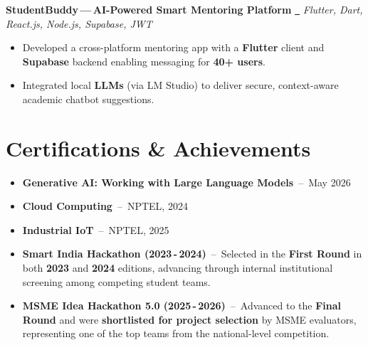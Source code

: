 \documentclass[a4paper,9pt]{article}
\begin{document}
{\vspace{3pt}

\noindent
\textbf{StudentBuddy\,---\,AI-Powered Smart Mentoring Platform}\;
\href{https://github.com/DEVARAJ-07/StudentBuddy}{\faGithub\ }
\hfill
\textit{Flutter, Dart, React.js, Node.js, Supabase, JWT}

\begin{itemize}[leftmargin=1em, itemsep=1pt, nosep]
  \item Developed a cross-platform mentoring app with a \textbf{Flutter} client and \textbf{Supabase} backend enabling messaging for \textbf{40+ users}.
  \item Integrated local \textbf{LLMs} (via LM Studio) to deliver secure, context-aware academic chatbot suggestions.
\end{itemize}

}

\section{Certifications \& Achievements}
{\small
\begin{itemize}[nosep, leftmargin=1em, itemsep=3pt]

  \item \textbf{Generative AI: Working with Large Language Models} \,--\, May 2026
  \item \textbf{Cloud Computing} \,--\, NPTEL, 2024
  \item \textbf{Industrial IoT} \,--\, NPTEL, 2025

  \item \textbf{Smart India Hackathon (2023\,-\,2024)} \,--\, Selected in the \textbf{First Round}
        in both \textbf{2023} and \textbf{2024} editions, advancing through internal
        institutional screening among competing student teams.

  \item \textbf{MSME Idea Hackathon 5.0 (2025\,-\,2026)} \,--\, Advanced to the
        \textbf{Final Round} and were \textbf{shortlisted for project selection} by
        MSME evaluators, representing one of the top teams from the national-level competition.

\end{itemize}
}
\end{document}
